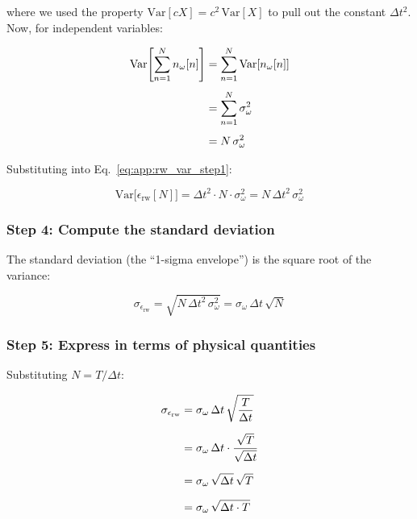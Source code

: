 \noindent where we used the property $\text{Var}[cX] = c^2\,\text{Var}[X]$ to
pull out the constant $\Delta t^2$. Now, for independent variables:

\begin{align}
  \text{Var}\!\left[\sum_{n=1}^{N} n_\omega[n]\right]
  &= \sum_{n=1}^{N} \text{Var}[n_\omega[n]] \notag \\[4pt]
  &= \sum_{n=1}^{N} \sigma_\omega^2 \notag \\[4pt]
  &= N\,\sigma_\omega^2
  \label{eq:app:rw_var_step2}
\end{align}

\noindent Substituting into Eq.~\eqref{eq:app:rw_var_step1}:

\begin{equation}
  \text{Var}\bigl[\epsilon_\text{rw}[N]\bigr]
  = \Delta t^2 \cdot N \cdot \sigma_\omega^2
  = N\,\Delta t^2\,\sigma_\omega^2
  \label{eq:app:rw_variance}
\end{equation}

\subsubsection{Step 4: Compute the standard deviation}

The standard deviation (the ``1-sigma envelope'') is the square root of the
variance:

\begin{equation}
  \sigma_{\epsilon_\text{rw}}
  = \sqrt{N\,\Delta t^2\,\sigma_\omega^2}
  = \sigma_\omega\,\Delta t\,\sqrt{N}
  \label{eq:app:rw_std_N}
\end{equation}

\subsubsection{Step 5: Express in terms of physical quantities}

Substituting $N = T / \Delta t$:

\begin{align}
  \sigma_{\epsilon_\text{rw}}
  &= \sigma_\omega\,\Delta t\,\sqrt{\frac{T}{\Delta t}} \notag \\[6pt]
  &= \sigma_\omega\,\Delta t \cdot \frac{\sqrt{T}}{\sqrt{\Delta t}} \notag \\[6pt]
  &= \sigma_\omega\,\sqrt{\Delta t}\,\sqrt{T} \notag \\[6pt]
  &= \sigma_\omega\,\sqrt{\Delta t \cdot T}
  \label{eq:app:rw_std_derivation}
\end{align}

